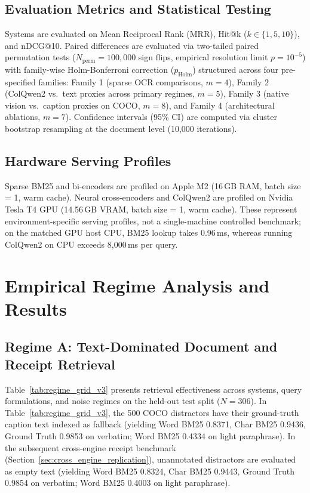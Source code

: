 \subsection{Evaluation Metrics and Statistical Testing}
Systems are evaluated on Mean Reciprocal Rank (MRR), Hit@k ($k \in \{1, 5, 10\}$), and nDCG@10. Paired differences are evaluated via two-tailed paired permutation tests ($N_{\text{perm}}=100{,}000$ sign flips, empirical resolution limit $p = 10^{-5}$) with family-wise Holm-Bonferroni correction ($p_{\text{Holm}}$) structured across four pre-specified families: Family 1 (sparse OCR comparisons, $m=4$), Family 2 (ColQwen2 vs.\ text proxies across primary regimes, $m=5$), Family 3 (native vision vs.\ caption proxies on COCO, $m=8$), and Family 4 (architectural ablations, $m=7$). Confidence intervals (95\% CI) are computed via cluster bootstrap resampling at the document level (10,000 iterations).

\subsection{Hardware Serving Profiles}
Sparse BM25 and bi-encoders are profiled on Apple M2 (16\,GB RAM, batch size = 1, warm cache). Neural cross-encoders and ColQwen2 are profiled on Nvidia Tesla T4 GPU (14.56\,GB VRAM, batch size = 1, warm cache). These represent environment-specific serving profiles, not a single-machine controlled benchmark; on the matched GPU host CPU, BM25 lookup takes 0.96\,ms, whereas running ColQwen2 on CPU exceeds 8,000\,ms per query.

\section{Empirical Regime Analysis and Results}
\label{sec:results}

\subsection{Regime A: Text-Dominated Document and Receipt Retrieval}
\label{sec:regime_a_text}

Table~\ref{tab:regime_grid_v3} presents retrieval effectiveness across systems, query formulations, and noise regimes on the held-out test split ($N=306$). In Table~\ref{tab:regime_grid_v3}, the 500 COCO distractors have their ground-truth caption text indexed as fallback (yielding Word BM25 0.8371, Char BM25 0.9436, Ground Truth 0.9853 on verbatim; Word BM25 0.4334 on light paraphrase). In the subsequent cross-engine receipt benchmark (Section~\ref{sec:cross_engine_replication}), unannotated distractors are evaluated as empty text (yielding Word BM25 0.8324, Char BM25 0.9443, Ground Truth 0.9854 on verbatim; Word BM25 0.4003 on light paraphrase).

